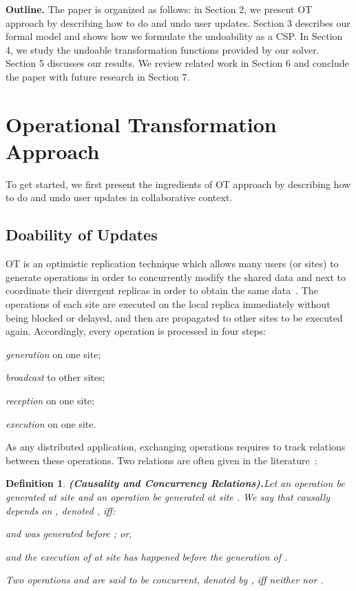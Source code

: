 \documentclass[submission,copyright,creativecommons]{eptcs}
\newtheorem{definition}{Definition}
\begin{document}
\medskip
\noindent\textbf{Outline.} The paper is organized as follows: in Section 2, we present  OT approach by describing how to do and undo user updates.
Section 3 describes our formal model and shows how we formulate the undoability as a CSP. In Section 4, we study the undoable transformation functions provided by our solver. Section 5 discusses our results.  
We review related work in Section 6 and conclude the paper with future research in Section 7.

 
 
\section{Operational Transformation Approach}  
To get started, we first present the ingredients of OT approach by describing how to do and undo
user updates in collaborative context.  

\subsection{Doability of Updates}\label{sec:do}
OT is an optimistic replication  technique which allows many users (or
sites) to generate operations in order to concurrently modify the  shared
data and next to coordinate
their divergent replicas in order to obtain the same  data~\cite{Ellis89,Sun98}. The operations
of each  site are  executed on the  local replica  immediately without
being blocked or delayed, and then are propagated to other sites to be
executed again.  Accordingly, every operation is processed in four steps:
\begin{inparaenum}[(i)]
\item \textit{generation} on one site;
\item \textit{broadcast} to other sites;
\item \textit{reception} on one site;
\item \textit{execution} on one site.
\end{inparaenum}

As any distributed application, exchanging operations requires to track relations
between these operations. Two relations are often given in the
literature~\cite{Ellis89,Sun98}:
\vspace{-0.1cm}
\begin{definition}\textbf{\emph{(Causality  and Concurrency Relations).}}\label{Def:caus}
Let an operation  be generated at site  and an  operation 
be generated at site . We say that  \emph{causally depends} on
, denoted , iff:
\begin{inparaenum}[(i)]
\item  and  was generated before ; or,
\item  and the execution of  at site  has happened before
      the generation of .
\end{inparaenum}
Two operations  and  are said to be \emph{concurrent},
denoted by , iff neither  nor
.
\end{definition}
\end{document}
